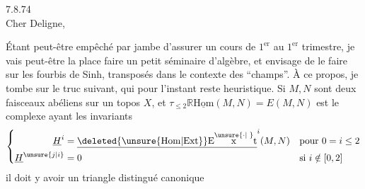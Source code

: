 
  7.8.74\\
Cher Deligne,\\


Étant peut-être empêché par  jambe d'assurer un cours de $1^{\mathrm{er}}$  au $1^{\mathrm{er}}$ trimestre, je vais peut-être  la place faire un petit séminaire d'algèbre, et envisage de le faire sur les fourbis de  Sinh,  transposés dans le contexte des ``champs''. À ce propos, je tombe sur le truc suivant, qui pour l'instant reste heuristique. Si $M,N$ sont deux faisceaux abéliens sur un topos $X$, et $\tau_{\leq 2}\mathbb{R}\underline{\mathrm{Hom}}(M,N)=E(M,N)$ est le complexe ayant les invariants
\[
\left\{\begin{aligned}
\underline{H}^{i}&=\underline{\deleted{\unsure{\mathrm{Hom}|\mathrm{Ext}}}\mathrm{E}\overset{\unsure{\cdot|\phantom{\cdot}}}{\mathrm{x}}\mathrm{t}}^{i}(M,N) &&\text{pour }0=i\leq 2\\
\underline{H}^{\unsure{j|i}}&=0 &&\text{si }i\notin[0,2]
\end{aligned}\right.
\]
il doit y avoir un triangle distingué canonique

